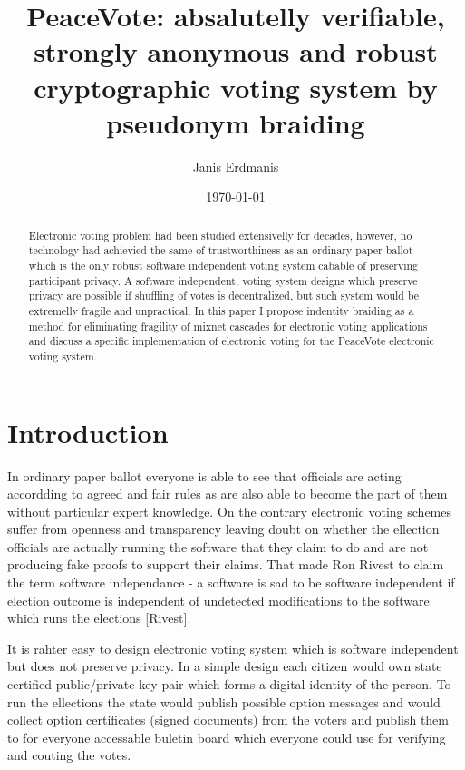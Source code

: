 \documentclass{article}
\title{PeaceVote: absalutelly verifiable, strongly anonymous and robust cryptographic voting system by pseudonym braiding}
\author{Janis Erdmanis}
\date{\today}
\begin{document}
\maketitle


\begin{abstract}
  Electronic voting problem had been studied extensivelly for decades, however, no technology had achievied the same of trustworthiness as an ordinary paper ballot which is the only robust software independent voting system cabable of preserving participant privacy. A software independent, voting system designs which preserve privacy are possible if shuffling of votes is decentralized, but such system would be extremelly fragile and unpractical. In this paper I propose indentity braiding as a method for eliminating fragility of mixnet cascades for electronic voting applications and discuss a specific implementation of electronic voting for the PeaceVote electronic voting system. 




\end{abstract}

\section{Introduction}

In ordinary paper ballot everyone is able to see that officials are acting accordding to agreed and fair rules as are also able to become the part of them without particular expert knowledge. On the contrary electronic voting schemes suffer from openness and transparency leaving doubt on whether the ellection officials are actually running the software that they claim to do and are not producing fake proofs to support their claims. That made Ron Rivest to claim the term software independance - a software is sad to be software independent if election outcome is independent of undetected modifications to the software which runs the elections [Rivest].

It is rahter easy to design electronic voting system which is software independent but does not preserve privacy. In a simple design each citizen would own state certified public/private key pair which forms a digital identity of the person. To run the ellections the state would publish possible option messages and would collect option certificates (signed documents) from the voters and publish them to for everyone accessable buletin board which everyone could use for verifying and couting the votes. 
\end{document}
